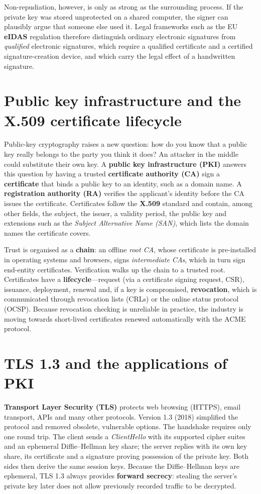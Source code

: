 \documentclass[11pt,openany]{book}
\begin{document}
Non-repudiation, however, is only as strong as the surrounding process. If the private key was stored unprotected on a shared computer, the signer can plausibly argue that someone else used it. Legal frameworks such as the EU \textbf{eIDAS} regulation therefore distinguish ordinary electronic signatures from \emph{qualified} electronic signatures, which require a qualified certificate and a certified signature-creation device, and which carry the legal effect of a handwritten signature.

\section{Public key infrastructure and the X.509 certificate lifecycle}\label{sec:7.4}
Public-key cryptography raises a new question: how do you know that a public key really belongs to the party you think it does? An attacker in the middle could substitute their own key. A \textbf{public key infrastructure (PKI)} answers this question by having a trusted \textbf{certificate authority (CA)} sign a \textbf{certificate} that binds a public key to an identity, such as a domain name. A \textbf{registration authority (RA)} verifies the applicant's identity before the CA issues the certificate. Certificates follow the \textbf{X.509} standard and contain, among other fields, the subject, the issuer, a validity period, the public key and extensions such as the \emph{Subject Alternative Name (SAN)}, which lists the domain names the certificate covers.

Trust is organised as a \textbf{chain}: an offline \emph{root CA}, whose certificate is pre-installed in operating systems and browsers, signs \emph{intermediate CAs}, which in turn sign end-entity certificates. Verification walks up the chain to a trusted root. Certificates have a \textbf{lifecycle}—request (via a certificate signing request, CSR), issuance, deployment, renewal and, if a key is compromised, \textbf{revocation}, which is communicated through revocation lists (CRLs) or the online status protocol (OCSP). Because revocation checking is unreliable in practice, the industry is moving towards short-lived certificates renewed automatically with the ACME protocol.

\section{TLS 1.3 and the applications of PKI}\label{sec:7.5}
\textbf{Transport Layer Security (TLS)} protects web browsing (HTTPS), email transport, APIs and many other protocols. Version 1.3 (2018) simplified the protocol and removed obsolete, vulnerable options. The handshake requires only one round trip. The client sends a \emph{ClientHello} with its supported cipher suites and an ephemeral Diffie–Hellman key share; the server replies with its own key share, its certificate and a signature proving possession of the private key. Both sides then derive the same session keys. Because the Diffie–Hellman keys are ephemeral, TLS 1.3 always provides \textbf{forward secrecy}: stealing the server's private key later does not allow previously recorded traffic to be decrypted.
\end{document}
